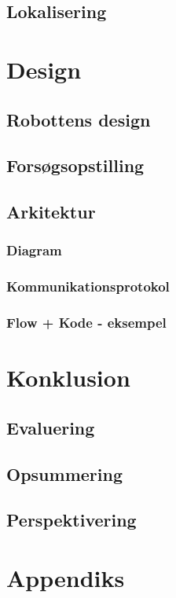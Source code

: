 \chapter{Lokalisering}


\part{Design}
\chapter{Robottens design}


\chapter{Forsøgsopstilling}

\chapter{Arkitektur}
\section{Diagram}
\section{Kommunikationsprotokol}

\section{Flow + Kode - eksempel}

\part{Konklusion}
\chapter{Evaluering}
\chapter{Opsummering}
\chapter{Perspektivering}

\appendix
\part{Appendiks}



